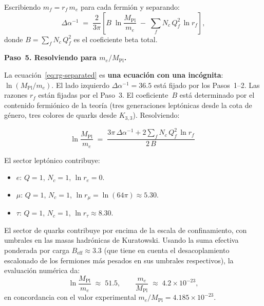 \documentclass[11pt, a4paper, openany]{book}
\begin{document}
Escribiendo $m_f = r_f \, m_e$ para cada fermi\'on y separando:
\begin{equation}
  \Delta\alpha^{-1}
  \;=\; \frac{2}{3\pi}\left[
  B\;\ln\frac{M_{\mathrm{Pl}}}{m_e}
  \;-\; \sum_f N_c\, Q_f^2\, \ln r_f
  \right],
  \tag{$M$-V.6}
  \label{eq:rg-separated}
\end{equation}
donde $B = \sum_f N_c\, Q_f^2$ es el coeficiente beta total.

\bigskip
\noindent
\textbf{Paso~5. Resolviendo para $m_e / M_{\mathrm{Pl}}$.}

\medskip\noindent
La ecuaci\'on~\eqref{eq:rg-separated} es \textbf{una ecuaci\'on con una
inc\'ognita}: $\ln(M_{\mathrm{Pl}}/m_e)$. El lado izquierdo
$\Delta\alpha^{-1} = 36.5$ est\'a fijado por los Pasos~1--2. Las
razones $r_f$ est\'an fijadas por el Paso~3. El coeficiente~$B$ est\'a
determinado por el contenido fermi\'onico de la teor\'ia (tres
generaciones lept\'onicas desde la cota de g\'enero, tres colores de
quarks desde $K_{3,3}$). Resolviendo:

\begin{equation}
  \boxed{\;
  \ln\frac{M_{\mathrm{Pl}}}{m_e}
  \;=\; \frac{3\pi\,\Delta\alpha^{-1}
    + 2\!\sum_f N_c\, Q_f^2\, \ln r_f}{2\, B}
  \;\;}
  \tag{$M$-V.7}
  \label{eq:me-solution}
\end{equation}

\noindent
El sector lept\'onico contribuye:
\begin{itemize}
  \item $e$: $Q = 1$, $N_c = 1$, $\ln r_e = 0$.
  \item $\mu$: $Q = 1$, $N_c = 1$, $\ln r_\mu = \ln(64\pi)
    \approx 5.30$.
  \item $\tau$: $Q = 1$, $N_c = 1$, $\ln r_\tau
    \approx 8.30$.
\end{itemize}
El sector de quarks contribuye por encima de la escala de confinamiento,
con umbrales en las masas hadr\'onicas de Kuratowski. Usando la suma
efectiva ponderada por carga $B_{\mathrm{eff}} \approx 3.3$ (que tiene
en cuenta el desacoplamiento escalonado de los fermiones m\'as pesados
en sus umbrales respectivos), la evaluaci\'on num\'erica da:
\[
  \ln\frac{M_{\mathrm{Pl}}}{m_e}
  \;\approx\; 51.5,
  \qquad
  \frac{m_e}{M_{\mathrm{Pl}}}
  \;\approx\; 4.2 \times 10^{-23},
\]
en concordancia con el valor experimental
$m_e/M_{\mathrm{Pl}} = 4.185 \times 10^{-23}$.
\end{document}
